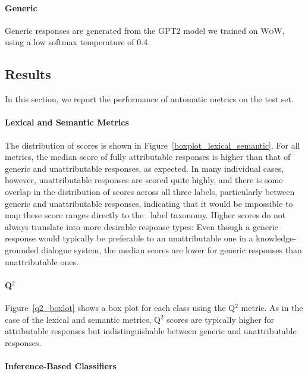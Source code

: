 \paragraph{Generic}
 Generic responses are generated from the \textsc{GPT2} model we trained on \textsc{WoW}, using a low softmax temperature of 0.4. 















 \subsection{Results}
In this section, we report the performance of automatic metrics on the \begindata{} test set.

 \paragraph{Lexical and Semantic Metrics}
The distribution of scores is shown in Figure~\ref{boxplot_lexical_semantic}. For all metrics, the median score of fully attributable responses is higher than that of generic and  unattributable responses, as expected. In many individual cases, however, unattributable responses are scored quite highly, and there is some overlap in the distribution of scores across all three labels, particularly between generic and unattributable responses, indicating that it would be impossible to map these score ranges directly to the \begindata\ label taxonomy.
Higher scores do not always translate into more desirable response types: Even though a generic response would typically be preferable to an unattributable one in a knowledge-grounded dialogue system, the median scores are lower for generic responses than unattributable ones.

 
 \paragraph{Q$^2$}  Figure~\ref{q2_boxlot} shows a box plot for each \begindata{} class using the Q$^2$  metric. As in the case of the lexical and semantic metrics, Q$^2$ scores are typically higher for attributable responses but indistinguishable between generic and unattributable responses.  
 
\paragraph{Inference-Based Classifiers}

